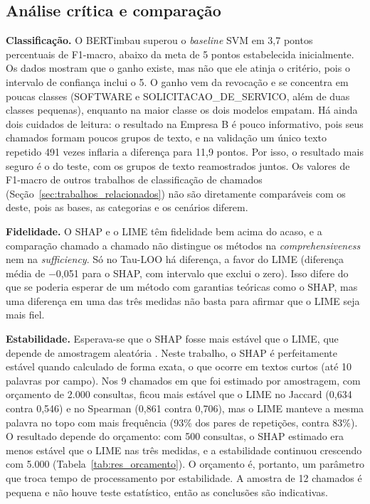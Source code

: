 \documentclass[
    12pt,                %
    openright,           %
    oneside,             %
    a4paper,             %
    english,             %
    brazil               %
]{abntex2}
\begin{document}
\subsection{Análise crítica e comparação}
\textbf{Classificação.} O BERTimbau superou o \textit{baseline} SVM em 3,7 pontos percentuais de F1-macro, abaixo da meta de 5 pontos estabelecida inicialmente. Os dados mostram que o ganho existe, mas não que ele atinja o critério, pois o intervalo de confiança inclui o 5. O ganho vem da revocação e se concentra em poucas classes (SOFTWARE e SOLICITACAO\_DE\_SERVICO, além de duas classes pequenas), enquanto na maior classe os dois modelos empatam. Há ainda dois cuidados de leitura: o resultado na Empresa B é pouco informativo, pois seus chamados formam poucos grupos de texto, e na validação um único texto repetido 491 vezes inflaria a diferença para 11,9 pontos. Por isso, o resultado mais seguro é o do teste, com os grupos de texto reamostrados juntos. Os valores de F1-macro de outros trabalhos de classificação de chamados (Seção~\ref{sec:trabalhos_relacionados}) não são diretamente comparáveis com os deste, pois as bases, as categorias e os cenários diferem.
 
\textbf{Fidelidade.} O SHAP e o LIME têm fidelidade bem acima do acaso, e a comparação chamado a chamado não distingue os métodos na \textit{comprehensiveness} nem na \textit{sufficiency}. Só no Tau-LOO há diferença, a favor do LIME (diferença média de $-$0,051 para o SHAP, com intervalo que exclui o zero). Isso difere do que se poderia esperar de um método com garantias teóricas como o SHAP, mas uma diferença em uma das três medidas não basta para afirmar que o LIME seja mais fiel.
 
\textbf{Estabilidade.} Esperava-se que o SHAP fosse mais estável que o LIME, que depende de amostragem aleatória \cite{ribeiro2016}. Neste trabalho, o SHAP é perfeitamente estável quando calculado de forma exata, o que ocorre em textos curtos (até 10 palavras por campo). Nos 9 chamados em que foi estimado por amostragem, com orçamento de 2.000 consultas, ficou mais estável que o LIME no Jaccard (0,634 contra 0,546) e no Spearman (0,861 contra 0,706), mas o LIME manteve a mesma palavra no topo com mais frequência (93\% dos pares de repetições, contra 83\%). O resultado depende do orçamento: com 500 consultas, o SHAP estimado era menos estável que o LIME nas três medidas, e a estabilidade continuou crescendo com 5.000 (Tabela~\ref{tab:res_orcamento}). O orçamento é, portanto, um parâmetro que troca tempo de processamento por estabilidade. A amostra de 12 chamados é pequena e não houve teste estatístico, então as conclusões são indicativas.
 
\end{document}
